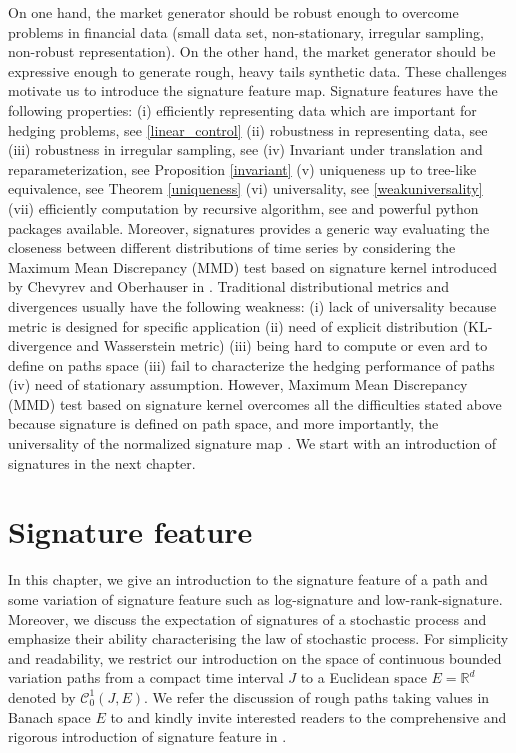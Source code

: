 \documentclass[12pt]{report}
\theoremstyle{definition}
\theoremstyle{remark}
\newcommand{\R}{\mathbb{R}}
\begin{document}
On one hand, the market generator should be robust enough to overcome problems in financial data (small data set, non-stationary, irregular sampling,  non-robust representation). On the other hand, the market generator should be expressive enough to generate rough, heavy tails synthetic data. These challenges motivate us to introduce the signature feature map. Signature features have the following properties: (i) efficiently representing data which are important for hedging problems, see \eqref{linear_control} (ii) robustness in representing data, see \cite{brigo2019probability} (iii) robustness in irregular sampling, see \cite{liao2019learning} (iv) Invariant under translation and reparameterization, see Proposition \ref{invariant} (v)          uniqueness up to tree-like equivalence, see Theorem \ref{uniqueness} (vi) universality, see \ref{weakuniversality} (vii) efficiently computation by recursive algorithm, see \cite{kiraly2019kernels} and powerful python packages available. Moreover, signatures provides a generic way evaluating the closeness between different distributions of time series by considering the Maximum
Mean Discrepancy (MMD) test \cite{gretton2012kernel} based on signature kernel introduced by Chevyrev and Oberhauser in \cite{chevyrev2018signature}. Traditional distributional metrics and divergences usually have the following weakness: (i) lack of universality because metric is designed for specific application (ii) need of explicit distribution (KL-divergence and Wasserstein metric) (iii) being hard to compute or even ard to define on paths space (iii) fail to characterize the hedging performance of paths (iv) need of stationary assumption. However, Maximum Mean Discrepancy (MMD) test based on signature kernel overcomes all the difficulties stated above because signature is defined on path space, and more importantly, the universality of the normalized signature map \cite{chevyrev2018signature}. We start with an introduction of signatures in the next chapter.    



\chapter{Signature feature}\label{signaturefeature}
In this chapter, we give an introduction to the signature feature of a path and some variation of signature feature such as log-signature and low-rank-signature. Moreover, we discuss the expectation of signatures of a stochastic process and emphasize their ability characterising the law of stochastic process. For simplicity and readability, we restrict our introduction on the space of continuous bounded variation paths from a compact time interval $J$ to a Euclidean space $E = \R^{d}$ denoted by $\mathcal{C}^{1}_{0}(J,E)$. We refer the discussion of rough paths taking values in Banach space $E$ to \cite{friz2020course, lyons2007differential} and kindly invite interested readers to the comprehensive and rigorous introduction of signature feature in \cite{friz2020course, lyons2007differential}.  
\end{document}
